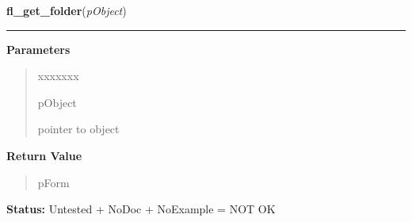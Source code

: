 \hspace{.8\funcindent}\begin{boxedminipage}{\funcwidth}

    \raggedright \textbf{fl\_get\_folder}(\textit{pObject})

    \vspace{-1.5ex}

    \rule{\textwidth}{0.5\fboxrule}
\setlength{\parskip}{2ex}
\setlength{\parskip}{1ex}
      \textbf{Parameters}
      \vspace{-1ex}

      \begin{quote}
        \begin{Ventry}{xxxxxxx}

          \item[pObject]

          pointer to object

        \end{Ventry}

      \end{quote}

      \textbf{Return Value}
    \vspace{-1ex}

      \begin{quote}
      pForm

      \end{quote}

\textbf{Status:} Untested + NoDoc + NoExample = NOT OK



    \end{boxedminipage}

    \label{xformslib:library:fl_get_folder_number}

    \vspace{0.5ex}

